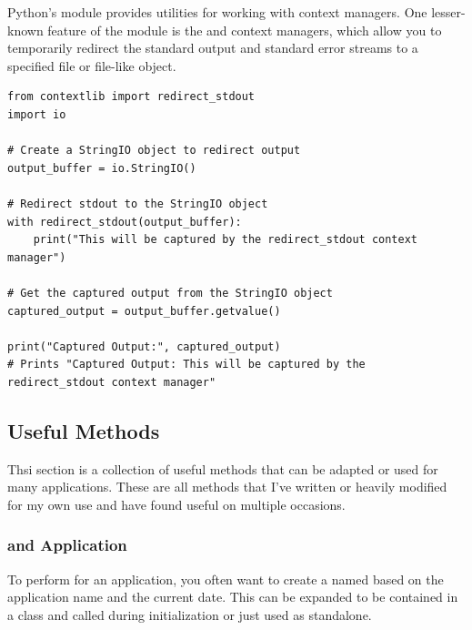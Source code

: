 Python's  module provides utilities for working with context managers. One lesser-known feature of the  module is the  and  context managers, which allow you to temporarily redirect the standard output and standard error streams to a specified file or file-like object.
\begin{lstlisting}
from contextlib import redirect_stdout
import io

# Create a StringIO object to redirect output
output_buffer = io.StringIO()

# Redirect stdout to the StringIO object
with redirect_stdout(output_buffer):
    print("This will be captured by the redirect_stdout context manager")

# Get the captured output from the StringIO object
captured_output = output_buffer.getvalue()

print("Captured Output:", captured_output)
# Prints "Captured Output: This will be captured by the redirect_stdout context manager"
\end{lstlisting}


























\subsection{Useful Methods}

Thsi section is a collection of useful methods that can be adapted or used for many applications. These are all methods that I've written or heavily modified for my own use and have found useful on multiple occasions.





\subsubsection{ and Application }

To perform  for an application, you often want to create a  named based on the application name and the current date. This can be expanded to be contained in a class and called during initialization or just used as standalone.

